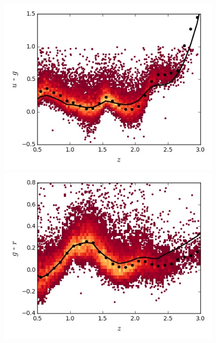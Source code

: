 \begin{figure}
  \centering
  \begin{minipage}[b]{0.49\textwidth}
    \includegraphics[width=\textwidth]{figures/chapter06/sed_color_plots/ug.jpg}
  \end{minipage}
  \begin{minipage}[b]{0.49\textwidth}
    \includegraphics[width=\textwidth]{figures/chapter06/sed_color_plots/gr.jpg}
  \end{minipage} \\
\begin{minipage}[b]{0.49\textwidth}

\end{minipage}
\end{figure}
